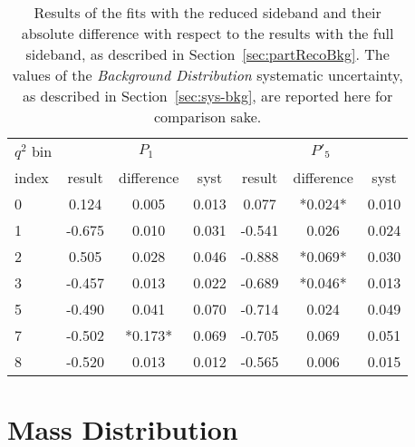 \begin{table*}[htb]
  \caption{Results of the fits with the reduced sideband and their absolute difference with respect to the results with the full sideband, as described in Section~\ref{sec:partRecoBkg}.
    The values of the \textit{Background Distribution} systematic uncertainty, as described in Section~\ref{sec:sys-bkg}, are reported here for comparison sake.\label{tab:red-sideband}}
          {\small
            \begin{center}
              \begin{tabular}{l|ccc|ccc}
                $q^2$ bin & \multicolumn{3}{c}{$P_1$} & \multicolumn{3}{c}{$P'_5$} \\
                index & result & difference & syst & result & difference & syst \\
                \hline
                0 &  0.124 & 0.005 & 0.013 &  0.077 &*0.024*& 0.010 \\
                1 & -0.675 & 0.010 & 0.031 & -0.541 & 0.026 & 0.024 \\
                2 &  0.505 & 0.028 & 0.046 & -0.888 &*0.069*& 0.030 \\
                3 & -0.457 & 0.013 & 0.022 & -0.689 &*0.046*& 0.013 \\
                5 & -0.490 & 0.041 & 0.070 & -0.714 & 0.024 & 0.049 \\
                7 & -0.502 &*0.173*& 0.069 & -0.705 & 0.069 & 0.051 \\
                8 & -0.520 & 0.013 & 0.012 & -0.565 & 0.006 & 0.015 \\
              \end{tabular}
            \end{center}
          }
\end{table*}



\section{Mass Distribution}
\label{sec:sys-mass distribution}



